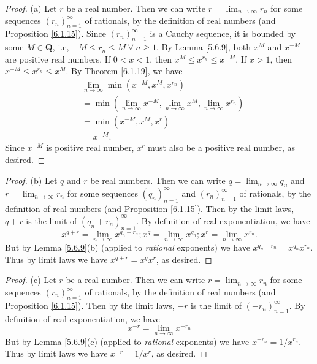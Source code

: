 \begin{proof}{(a)}
    Let \(r\) be a real number.
    Then we can write \(r = \lim_{n \to \infty} r_n\) for some sequences \((r_n)_{n = 1}^\infty\) of rationals, by the definition of real numbers (and Proposition \ref{6.1.15}).
    Since \((r_n)_{n = 1}^\infty\) is a Cauchy sequence, it is bounded by some \(M \in \mathbf{Q}\), i.e, \(-M \leq r_n \leq M \ \forall\ n \geq 1\).
    By Lemma \ref{5.6.9}, both \(x^M\) and \(x^{-M}\) are positive real numbers.
    If \(0 < x < 1\), then \(x^M \leq x^{r_n} \leq x^{-M}\).
    If \(x > 1\), then \(x^{-M} \leq x^{r_n} \leq x^M\).
    By Theorem \ref{6.1.19}, we have
    \begin{align*}
         & \lim_{n \to \infty} \min(x^{-M}, x^M, x^{r_n})                                           \\
         & = \min(\lim_{n \to \infty} x^{-M}, \lim_{n \to \infty} x^M, \lim_{n \to \infty} x^{r_n}) \\
         & = \min(x^{-M}, x^M, x^r)                                                                 \\
         & = x^{-M}.
    \end{align*}
    Since \(x^{-M}\) is positive real number, \(x^r\) must also be a positive real number, as desired.
\end{proof}

\begin{proof}{(b)}
    Let \(q\) and \(r\) be real numbers.
    Then we can write \(q = \lim_{n \to \infty} q_n\) and \(r = \lim_{n \to \infty} r_n\) for some sequences \((q_n)_{n = 1}^\infty\) and \((r_n)_{n = 1}^\infty\) of rationals, by the definition of real numbers (and Proposition \ref{6.1.15}).
    Then by the limit laws, \(q + r\) is the limit of \((q_n + r_n)_{n = 1}^\infty\).
    By definition of real exponentiation, we have
    \[
        x^{q + r} = \lim_{n \to \infty} x^{q_n + r_n} ; x^q = \lim_{n \to \infty} x^{q_n} ;  x^r = \lim_{n \to \infty} x^{r_n}.
    \]
    But by Lemma \ref{5.6.9}(b) (applied to \emph{rational} exponents) we have \(x^{q_n + r_n} = x^{q_n} x^{r_n}\).
    Thus by limit laws we have \(x^{q + r} = x^q x^r\), as desired.
\end{proof}

\begin{proof}{(c)}
    Let \(r\) be a real number.
    Then we can write \(r = \lim_{n \to \infty} r_n\) for some sequences \((r_n)_{n = 1}^\infty\) of rationals, by the definition of real numbers (and Proposition \ref{6.1.15}).
    Then by the limit laws, \(-r\) is the limit of \((-r_n)_{n = 1}^\infty\).
    By definition of real exponentiation, we have
    \[
        x^{-r} = \lim_{n \to \infty} x^{-r_n}
    \]
    But by Lemma \ref{5.6.9}(c) (applied to \emph{rational} exponents) we have \(x^{-r_n} = 1 / x^{r_n}\).
    Thus by limit laws we have \(x^{-r} = 1 / x^r\), as desired.
\end{proof}

